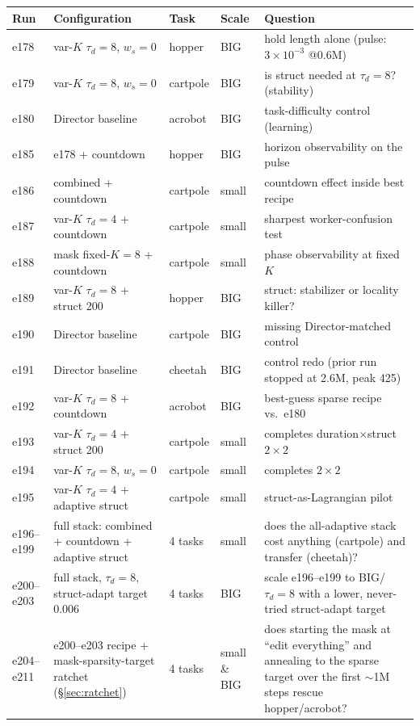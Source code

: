 \documentclass[10pt]{article}
\begin{document}
\begin{table}[h]
\centering\small
\begin{tabular}{lllll}
\toprule
Run & Configuration & Task & Scale & Question \\
\midrule
e178 & var-$K$ $\tau_d{=}8$, $w_s{=}0$ & hopper & BIG & hold length alone (pulse: $3{\times}10^{-3}$ @0.6M) \\
e179 & var-$K$ $\tau_d{=}8$, $w_s{=}0$ & cartpole & BIG & is struct needed at $\tau_d{=}8$? (stability) \\
e180 & Director baseline & acrobot & BIG & task-difficulty control (learning) \\
e185 & e178 + countdown & hopper & BIG & horizon observability on the pulse \\
e186 & combined + countdown & cartpole & small & countdown effect inside best recipe \\
e187 & var-$K$ $\tau_d{=}4$ + countdown & cartpole & small & sharpest worker-confusion test \\
e188 & mask fixed-$K{=}8$ + countdown & cartpole & small & phase observability at fixed $K$ \\
e189 & var-$K$ $\tau_d{=}8$ + struct 200 & hopper & BIG & struct: stabilizer or locality killer? \\
e190 & Director baseline & cartpole & BIG & missing Director-matched control \\
e191 & Director baseline & cheetah & BIG & control redo (prior run stopped at 2.6M, peak 425) \\
e192 & var-$K$ $\tau_d{=}8$ + countdown & acrobot & BIG & best-guess sparse recipe vs.\ e180 \\
e193 & var-$K$ $\tau_d{=}4$ + struct 200 & cartpole & small & completes duration$\times$struct $2{\times}2$ \\
e194 & var-$K$ $\tau_d{=}8$, $w_s{=}0$ & cartpole & small & completes $2{\times}2$ \\
e195 & var-$K$ $\tau_d{=}4$ + adaptive struct & cartpole & small & struct-as-Lagrangian pilot \\
e196--e199 & full stack: combined + countdown + adaptive struct & 4 tasks & small & does the all-adaptive stack cost anything (cartpole) and transfer (cheetah)? \\
e200--e203 & full stack, $\tau_d{=}8$, struct-adapt target 0.006 & 4 tasks & BIG & scale e196--e199 to BIG/$\tau_d{=}8$ with a lower, never-tried struct-adapt target \\
e204--e211 & e200--e203 recipe + mask-sparsity-target ratchet (\S\ref{sec:ratchet}) & 4 tasks & small \& BIG & does starting the mask at ``edit everything'' and annealing to the sparse target over the first $\sim$1M steps rescue hopper/acrobot? \\

\end{tabular}
\end{table}
\end{document}
